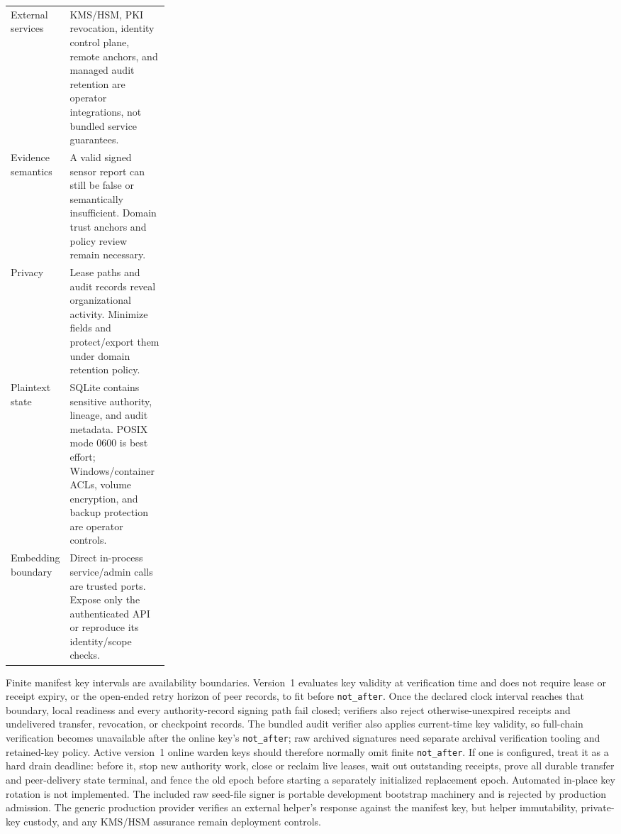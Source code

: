\documentclass[10pt]{article}
\newcommand{\code}[1]{\nolinkurl{#1}}
\begin{document}
\begin{center}
\begin{tabularx}{\linewidth}{@{}p{0.26\linewidth}X@{}}
External services & KMS/HSM, PKI revocation, identity control plane, remote anchors, and managed audit retention are operator integrations, not bundled service guarantees. \\
Evidence semantics & A valid signed sensor report can still be false or semantically insufficient. Domain trust anchors and policy review remain necessary. \\
Privacy & Lease paths and audit records reveal organizational activity. Minimize fields and protect/export them under domain retention policy. \\
Plaintext state & SQLite contains sensitive authority, lineage, and audit metadata. POSIX mode 0600 is best effort; Windows/container ACLs, volume encryption, and backup protection are operator controls. \\
Embedding boundary & Direct in-process service/admin calls are trusted ports. Expose only the authenticated API or reproduce its identity/scope checks. \\
\bottomrule
\end{tabularx}
\end{center}

Finite manifest key intervals are availability boundaries. Version~1 evaluates key validity at
verification time and does not require lease or receipt expiry, or the open-ended retry horizon of
peer records, to fit before \code{not_after}. Once the declared clock interval reaches that boundary,
local readiness and every authority-record signing path fail closed; verifiers also reject
otherwise-unexpired receipts and undelivered transfer, revocation, or checkpoint records. The
bundled audit verifier also applies current-time key validity, so full-chain verification becomes
unavailable after the online key's \code{not_after}; raw archived signatures need separate archival
verification tooling and retained-key policy. Active version~1 online warden keys should therefore
normally omit finite \code{not_after}. If one is
configured, treat it as a hard drain deadline: before it, stop new authority work, close or reclaim
live leases, wait out outstanding receipts, prove all durable transfer and peer-delivery state
terminal, and fence the old epoch before starting a separately initialized replacement epoch.
Automated in-place key rotation is not implemented. The included raw seed-file signer is portable
development bootstrap machinery and is rejected by production admission. The generic production
provider verifies an external helper's response against the manifest key, but helper immutability,
private-key custody, and any KMS/HSM assurance remain deployment controls.
\end{document}
